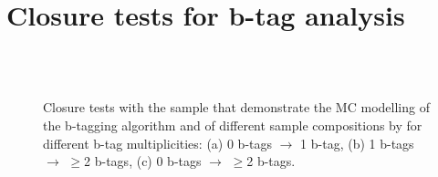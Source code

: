 
\newpage
\section{Closure tests for b-tag analysis}

\begin{figure}[!h]
  \begin{center}
     \\
     \\
    \caption{Closure tests with the \mj sample that demonstrate the MC
      modelling of the b-tagging algorithm and of different sample
      compositions by for different b-tag multiplicities: (a) 0 b-tags
      $\rightarrow$ 1 b-tag, (b) 1 b-tags $\rightarrow$ $\geq$2
      b-tags, (c) 0 b-tags $\rightarrow$ $\geq$2 b-tags.}
  \label{fig:btag-multi-closure}
  \end{center}
\end{figure}

